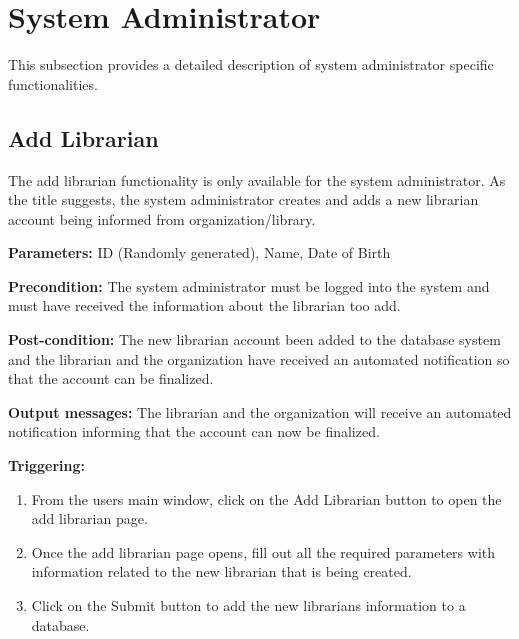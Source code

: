 \documentclass{article}
\begin{document}
\section{System Administrator}
\label{operation:System Administrator}

This subsection provides a detailed description of system administrator specific functionalities.

\subsection{Add Librarian}

The add librarian functionality is only available for the system administrator. As the title suggests, the system administrator creates and adds a new librarian account being informed from organization/library. 

\begin{description}

\item \textbf{Parameters:} ID (Randomly generated), Name, Date of Birth

\item \textbf{Precondition:} The system administrator must be logged into the system and must have received the information about the librarian too add. 

\item \textbf{Post-condition:} The new librarian account been added to the database system and the librarian and the organization have received an automated notification so that the account can be finalized. 

\item \textbf{Output messages:} The librarian and the organization will receive an automated notification informing that the account can now be finalized. 

\item \textbf{Triggering:}
\begin{enumerate}

\item From the users main window, click on the Add Librarian button to open the add librarian page. 

\item Once the add librarian page opens, fill out all the required parameters with information related to the new librarian that is being created. 

\item Click on the Submit button to add the new librarians information to a database. 

\end{enumerate}

\end{description}
\end{document}
